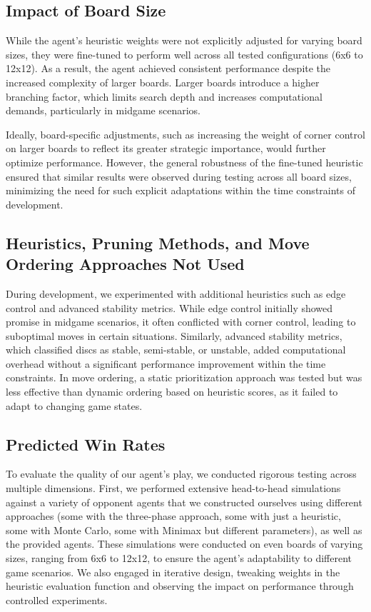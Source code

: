\documentclass[11pt]{article}
\begin{document}
\subsection*{Impact of Board Size}
While the agent's heuristic weights were not explicitly adjusted for varying board sizes, they were fine-tuned to perform well across all tested configurations (6x6 to 12x12). As a result, the agent achieved consistent performance despite the increased complexity of larger boards. Larger boards introduce a higher branching factor, which limits search depth and increases computational demands, particularly in midgame scenarios. 

\noindent Ideally, board-specific adjustments, such as increasing the weight of corner control on larger boards to reflect its greater strategic importance, would further optimize performance. However, the general robustness of the fine-tuned heuristic ensured that similar results were observed during testing across all board sizes, minimizing the need for such explicit adaptations within the time constraints of development.

\subsection*{Heuristics, Pruning Methods, and Move Ordering Approaches Not Used}
During development, we experimented with additional heuristics such as edge control and advanced stability metrics. While edge control initially showed promise in midgame scenarios, it often conflicted with corner control, leading to suboptimal moves in certain situations. Similarly, advanced stability metrics, which classified discs as stable, semi-stable, or unstable, added computational overhead without a significant performance improvement within the time constraints. In move ordering, a static prioritization approach was tested but was less effective than dynamic ordering based on heuristic scores, as it failed to adapt to changing game states.

\subsection*{Predicted Win Rates}

To evaluate the quality of our agent's play, we conducted rigorous testing across multiple dimensions. First, we performed extensive head-to-head simulations against a variety of opponent agents that we constructed ourselves using different approaches (some with the three-phase approach, some with just a heuristic, some with Monte Carlo, some with Minimax but different parameters), as well as the provided agents. These simulations were conducted on even boards of varying sizes, ranging from 6x6 to 12x12, to ensure the agent's adaptability to different game scenarios. We also engaged in iterative design, tweaking weights in the heuristic evaluation function and observing the impact on performance through controlled experiments.
\end{document}
